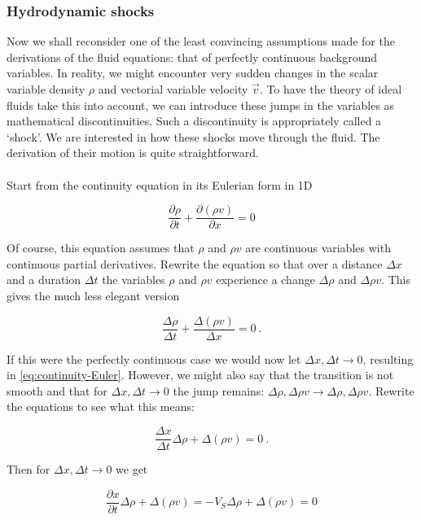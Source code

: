 \subsubsection{Hydrodynamic shocks}

Now we shall reconsider one of the least convincing assumptions made for the derivations of the fluid equations: that of perfectly continuous background variables. In reality, we might encounter very sudden changes in the scalar variable density $\rho$ and vectorial variable velocity $\vec{v}$. To have the theory of ideal fluids take this into account, we can introduce these jumps in the variables as mathematical discontinuities. Such a discontinuity is appropriately called a `shock'. We are interested in how these shocks move through the fluid. The derivation of their motion is quite straightforward.\\
\\
Start from the continuity equation in its Eulerian form in 1D

\begin{equation}
\label{eq:continuity-Euler}
\frac{\partial \rho}{\partial t} + \frac{\partial(\rho v)}{\partial x} = 0
\end{equation}

Of course, this equation assumes that $\rho$ and $\rho v$ are continuous variables with continuous partial derivatives. Rewrite the equation so that over a distance $\Delta x$ and a duration $\Delta t$ the variables $\rho$ and $\rho v$ experience a change $\Delta\rho$ and $\Delta \rho v$. This gives the much less elegant version 

$$ \frac{\Delta \rho}{\Delta t} + \frac{\Delta(\rho v)}{\Delta x} = 0 \ . $$

If this were the perfectly continuous case we would now let $\Delta x, \Delta t \to 0$, resulting in \cref{eq:continuity-Euler}. However, we might also say that the transition is not smooth and that for $\Delta x, \Delta t \to 0$ the jump remains: $ \Delta \rho, \Delta \rho v \to \Delta \rho, \Delta \rho v $. Rewrite the equations to see what this means:

$$ \frac{\Delta x}{\Delta t} \Delta \rho + \Delta(\rho v) = 0 \ . $$

Then for $\Delta x, \Delta t \to 0$ we get 

\begin{equation}
\label{eq:HD-shock-condition}
\frac{\partial x}{\partial t} \Delta \rho + \Delta(\rho v) = -V_S \Delta \rho + \Delta(\rho v) = 0
\end{equation}

